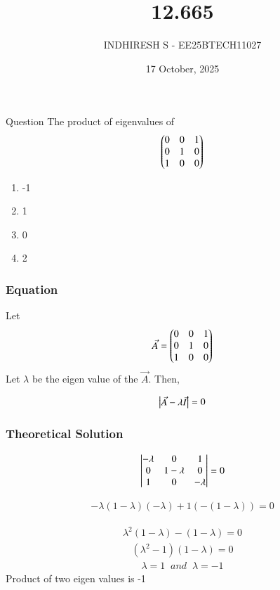 \documentclass{beamer}
\title %
    {12.665}
\date{17 October, 2025}
\author %
    {INDHIRESH S - EE25BTECH11027}
\begin{document}
    
    \frame{\titlepage}
    
    \begin{frame}{Question}
 The product of eigenvalues of
  \begin{align*}
      \begin{pmatrix}0&0&1\\0&1&0\\1&0&0\end{pmatrix}
  \end{align*}
\begin{enumerate}
    \item -1
    \item 1
    \item  0
    \item 2
\end{enumerate}
    \end{frame}
    
    \begin{frame}[allowframebreaks] 
    \frametitle{Equation}
        \centering
        \label{tab:parameters}
 Let
\begin{align}
 \Vec{A}=\begin{pmatrix}0&0&1\\0&1&0\\1&0&0\end{pmatrix}
\end{align}
Let $\lambda$ be the eigen value of the $\Vec{A}$. Then,

\begin{align}
  \begin{vmatrix}\Vec{A}-\lambda\Vec{I}\end{vmatrix}=0
\end{align}

    \end{frame}
    
    \begin{frame}
    \frametitle{Theoretical Solution}
   \begin{align}
  \begin{vmatrix}-\lambda&0&1\\0&1-\lambda&0\\1&0&-\lambda\end{vmatrix}=0
\end{align}

\begin{align}
  -\lambda(1-\lambda)(-\lambda)+1(-(1-\lambda))=0
\end{align}

\begin{align}
\lambda^2(1-\lambda)-(1-\lambda)=0
\end{align}
\begin{align}
    (\lambda^2-1)(1-\lambda)=0
\end{align}
\begin{align}
    \lambda=1\;\;and\;\;\lambda=-1
\end{align}
Product of two eigen values is -1



    \end{frame}
    
    

    
\end{document}
